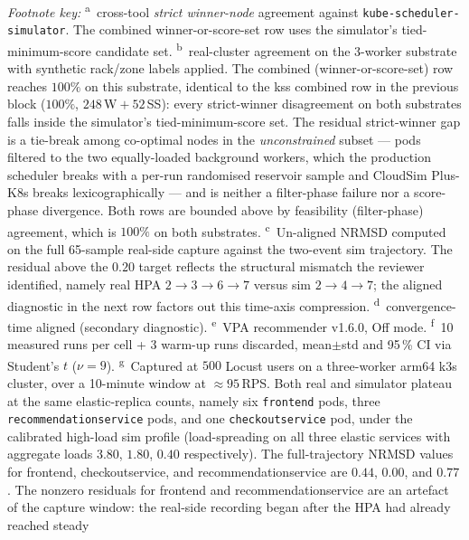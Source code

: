 \documentclass[ASNA,twocolumn]{USG}
\newcommand{\ckm}{CloudSim Plus-K8s\xspace}
\begin{document}
    \noindent\emph{Footnote key:}
    \textsuperscript{a}~cross-tool \emph{strict winner-node} agreement against
    \texttt{kube-scheduler-simulator}. The combined winner-or-score-set
    row uses the simulator's tied-minimum-score candidate set.
    \textsuperscript{b}~real-cluster agreement on the 3-worker substrate
    with synthetic rack/zone labels applied. The combined
    (winner-or-score-set) row reaches $100\%$ on this substrate, identical
    to the kss combined row in the previous block ($100\%$,
    $248$\,W${}+52$\,SS): every strict-winner disagreement on both
    substrates falls inside the simulator's tied-minimum-score set. The
    residual strict-winner gap is a tie-break among co-optimal nodes in the
    \emph{unconstrained} subset --- pods filtered to the two equally-loaded
    background workers, which the production scheduler breaks with a per-run
    randomised reservoir sample and \ckm breaks lexicographically --- and
    is neither a filter-phase failure nor a score-phase divergence. Both
    rows are bounded above by feasibility (filter-phase) agreement, which is
    $100\%$ on both substrates.
    \textsuperscript{c}~Un-aligned NRMSD computed on the full
    65-sample real-side capture against the two-event sim trajectory.
    The residual above the $0.20$ target reflects the structural
    mismatch the reviewer identified, namely real HPA $2{\to}3{\to}6{\to}7$
    versus sim $2{\to}4{\to}7$; the aligned diagnostic in the next row
    factors out this time-axis compression.
    \textsuperscript{d}~convergence-time aligned (secondary diagnostic).
    \textsuperscript{e}~VPA recommender v1.6.0, Off mode.
    \textsuperscript{f}~10 measured runs per cell + 3 warm-up runs
    discarded, mean$\pm$std and 95\,\% CI via Student's $t$ ($\nu=9$).
    \textsuperscript{g}~Captured at $500$ Locust users on a three-worker
    arm64 k3s cluster, over a 10-minute window at $\approx\!95\,$RPS. Both
    real and simulator plateau at the same
    elastic-replica counts, namely six \texttt{frontend} pods, three
    \texttt{recommendationservice} pods, and one \texttt{checkoutservice}
    pod, under the calibrated high-load sim profile (load-spreading on
    all three elastic services with aggregate loads $3.80$, $1.80$,
    $0.40$ respectively). The full-trajectory NRMSD values for
    frontend, checkoutservice, and recommendationservice are $0.44$,
    $0.00$, and $0.77$. The nonzero residuals for frontend and
    recommendationservice are an artefact of the capture window: the
    real-side recording began after the HPA had already reached steady
\end{document}
